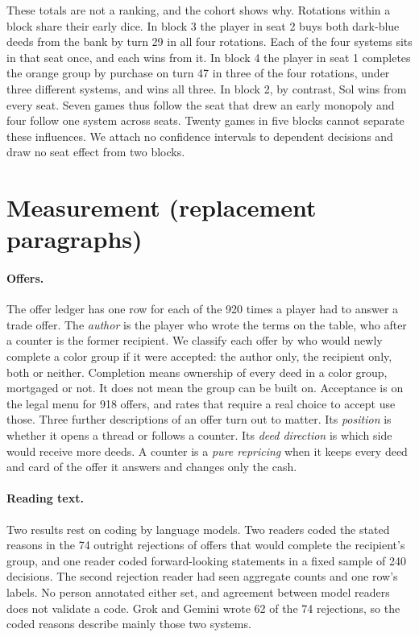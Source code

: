 These totals are not a ranking, and the cohort shows why. Rotations within a block share their early dice. In block 3 the player in seat 2 buys both dark-blue deeds from the bank by turn 29 in all four rotations. Each of the four systems sits in that seat once, and each wins from it. In block 4 the player in seat 1 completes the orange group by purchase on turn 47 in three of the four rotations, under three different systems, and wins all three. In block 2, by contrast, Sol wins from every seat. Seven games thus follow the seat that drew an early monopoly and four follow one system across seats. Twenty games in five blocks cannot separate these influences. We attach no confidence intervals to dependent decisions and draw no seat effect from two blocks.

\section{Measurement (replacement paragraphs)}
\label{sec:measurement}

\paragraph{Offers.} The offer ledger has one row for each of the 920 times a player had to answer a trade offer. The \emph{author} is the player who wrote the terms on the table, who after a counter is the former recipient. We classify each offer by who would newly complete a color group if it were accepted: the author only, the recipient only, both or neither. Completion means ownership of every deed in a color group, mortgaged or not. It does not mean the group can be built on. Acceptance is on the legal menu for 918 offers, and rates that require a real choice to accept use those. Three further descriptions of an offer turn out to matter. Its \emph{position} is whether it opens a thread or follows a counter. Its \emph{deed direction} is which side would receive more deeds. A counter is a \emph{pure repricing} when it keeps every deed and card of the offer it answers and changes only the cash.

\paragraph{Reading text.} Two results rest on coding by language models. Two readers coded the stated reasons in the 74 outright rejections of offers that would complete the recipient's group, and one reader coded forward-looking statements in a fixed sample of 240 decisions. The second rejection reader had seen aggregate counts and one row's labels. No person annotated either set, and agreement between model readers does not validate a code. Grok and Gemini wrote 62 of the 74 rejections, so the coded reasons describe mainly those two systems.

